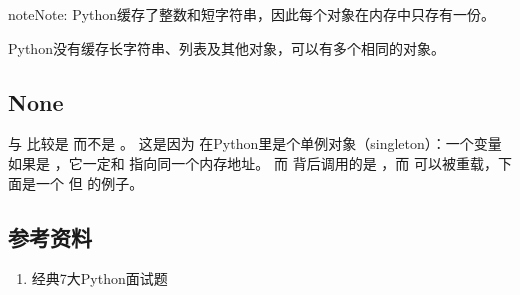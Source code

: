\documentclass[letterpaper,10pt,english]{sphinxmanual}
\begin{document}
\begin{sphinxadmonition}{note}{Note:}
Python缓存了整数和短字符串，因此每个对象在内存中只存有一份。

Python没有缓存长字符串、列表及其他对象，可以有多个相同的对象。
\end{sphinxadmonition}


\subsection{None}
\label{\detokenize{python/03_is:none}}
与  比较是  而不是  。
这是因为  在Python里是个单例对象（singleton）：一个变量如果是  ，它一定和  指向同一个内存地址。
而  背后调用的是  ，而  可以被重载，下面是一个  但  的例子。

%
\begin{sphinxVerbatim}[commandchars=\\\{\},numbers=left,firstnumber=1,stepnumber=1]
 
     
        

  
  
  
\end{sphinxVerbatim}


\subsection{参考资料}
\label{\detokenize{python/03_is:id2}}\begin{enumerate}
\item {} 
经典7大Python面试题

\end{enumerate}
\begin{quote}

\end{quote}
\end{document}
